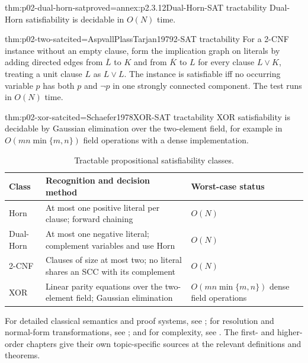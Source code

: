 \begin{hbcorollary}{thm:p02-dual-horn-sat}{proved=annex:p2.3.12}{Dual-Horn-SAT tractability}
Dual-Horn satisfiability is decidable in \(O(N)\) time.
\end{hbcorollary}

\begin{hbtheorem}{thm:p02-two-sat}{cited=AspvallPlassTarjan1979}{2-SAT tractability}
For a 2-CNF instance without an empty clause, form the implication graph on
literals by adding directed edges from \(\overline L\) to \(K\) and from
\(\overline K\) to \(L\) for every clause \(L\lor K\), treating a unit clause
\(L\) as \(L\lor L\).  The instance
is satisfiable iff no occurring variable \(p\) has both \(p\) and \(\neg p\)
in one strongly connected component.  The test runs in \(O(N)\) time.
\end{hbtheorem}

\begin{hbtheorem}{thm:p02-xor-sat}{cited=Schaefer1978}{XOR-SAT tractability}
XOR satisfiability is decidable by Gaussian elimination over the two-element
field, for example in \(O(mn\min\{m,n\})\) field operations with a dense
implementation.
\end{hbtheorem}

\begin{table}[tp]
\centering
\small
\begin{tabular}{@{}p{}p{}p{}@{}}
\toprule
Class & Recognition and decision method & Worst-case status \\
\midrule
Horn & At most one positive literal per clause; forward chaining & \(O(N)\) \\
Dual-Horn & At most one negative literal; complement variables and use Horn & \(O(N)\) \\
2-CNF & Clauses of size at most two; no literal shares an SCC with its complement & \(O(N)\) \\
XOR & Linear parity equations over the two-element field; Gaussian elimination & \(O(mn\min\{m,n\})\) dense field operations \\
\bottomrule
\end{tabular}
\caption{Tractable propositional satisfiability classes.}
\label{tab:p02-tractable-sat}
\end{table}

For detailed classical semantics and proof systems, see
\cite{EbbinghausFlumThomas1994,OpenLogic2026,Kleene1952}; for resolution and
normal-form transformations, see
\cite{Robinson1965,BaazEglyLeitsch2001}; and for complexity, see
\cite{Cook1971,AroraBarak2009}.  The first- and higher-order chapters give
their own topic-specific sources at the relevant definitions and theorems.

